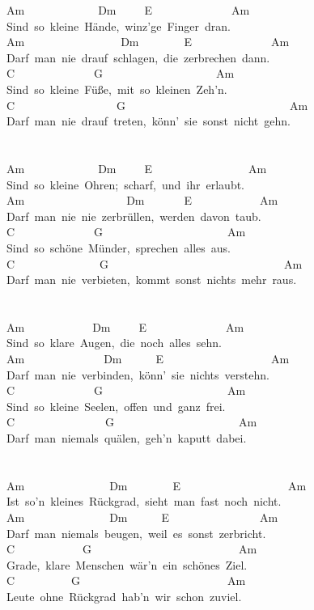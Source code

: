 \documentclass[]{book}
\begin{document}
Am~~~~~~~~~~~~~Dm~~~~~E~~~~~~~~~~~~~~Am\\
Sind~so~kleine~Hände,~winz'ge~Finger~dran.\\
Am~~~~~~~~~~~~~~~~~Dm~~~~~~~~E~~~~~~~~~~~~~~Am\\
Darf~man~nie~drauf~schlagen,~die~zerbrechen~dann.\\
C~~~~~~~~~~~~~~G~~~~~~~~~~~~~~~~~~~~Am\\
Sind~so~kleine~Füße,~mit~so~kleinen~Zeh'n.\\
C~~~~~~~~~~~~~~~~~~G~~~~~~~~~~~~~~~~~~~~~~~~~~~~~Am\\
Darf~man~nie~drauf~treten,~könn'~sie~sonst~nicht~gehn.\\
~\\
~\\
Am~~~~~~~~~~~~~Dm~~~~~E~~~~~~~~~~~~~~~~~Am\\
Sind~so~kleine~Ohren;~scharf,~und~ihr~erlaubt.\\
Am~~~~~~~~~~~~~~~~~~Dm~~~~~~~E~~~~~~~~~~~~Am\\
Darf~man~nie~nie~zerbrüllen,~werden~davon~taub.\\
C~~~~~~~~~~~~~~G~~~~~~~~~~~~~~~~~~~~~~Am\\
Sind~so~schöne~Münder,~sprechen~alles~aus.\\
C~~~~~~~~~~~~~~~G~~~~~~~~~~~~~~~~~~~~~~~~~~~~~~~Am\\
Darf~man~nie~verbieten,~kommt~sonst~nichts~mehr~raus.\\
~\\
~\\
Am~~~~~~~~~~~~Dm~~~~~E~~~~~~~~~~~~~~Am\\
Sind~so~klare~Augen,~die~noch~alles~sehn.\\
Am~~~~~~~~~~~~~~Dm~~~~~~E~~~~~~~~~~~~~~~~~~~Am\\
Darf~man~nie~verbinden,~könn'~sie~nichts~verstehn.\\
C~~~~~~~~~~~~~~G~~~~~~~~~~~~~~~~~~~~~~Am\\
Sind~so~kleine~Seelen,~offen~und~ganz~frei.\\
C~~~~~~~~~~~~~~~~G~~~~~~~~~~~~~~~~~~~~~~Am\\
Darf~man~niemals~quälen,~geh'n~kaputt~dabei.\\
~\\
~\\
Am~~~~~~~~~~~~~~~Dm~~~~~~~~E~~~~~~~~~~~~~~~~~~~Am\\
Ist~so'n~kleines~Rückgrad,~sieht~man~fast~noch~nicht.\\
Am~~~~~~~~~~~~~~~Dm~~~~~~E~~~~~~~~~~~~~~~~Am\\
Darf~man~niemals~beugen,~weil~es~sonst~zerbricht.\\
C~~~~~~~~~~~~G~~~~~~~~~~~~~~~~~~~~~~~~~~Am\\
Grade,~klare~Menschen~wär'n~ein~schönes~Ziel.\\
C~~~~~~~~~~G~~~~~~~~~~~~~~~~~~~~~~~~~~Am\\
Leute~ohne~Rückgrad~hab'n~wir~schon~zuviel.\\
\end{document}
